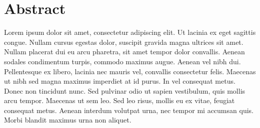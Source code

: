 \documentclass[a4paper, 12pt]{report}
\begin{document}

\chapter*{Abstract}
Lorem ipsum dolor sit amet, consectetur adipiscing elit. Ut lacinia ex eget sagittis congue.
Nullam cursus egestas dolor, suscipit gravida magna ultrices sit amet. Nullam placerat dui eu
arcu pharetra, sit amet tempor dolor convallis. Aenean sodales condimentum turpis, commodo maximus
augue. Aenean vel nibh dui. Pellentesque ex libero, lacinia nec mauris vel, convallis consectetur
felis. Maecenas ut nibh sed magna maximus imperdiet at id purus. In vel consequat metus. Donec non
tincidunt nunc. Sed pulvinar odio ut sapien vestibulum, quis mollis arcu tempor. Maecenas ut sem leo.
Sed leo risus, mollis eu ex vitae, feugiat consequat metus. Aenean interdum volutpat urna, nec
tempor mi accumsan quis. Morbi blandit maximus urna non aliquet.


\tableofcontents


















\end{document}
